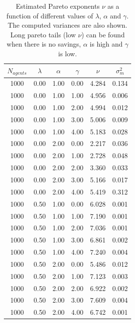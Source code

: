 \documentclass[11pt,a4paper,titlepage]{article}
\begin{document}
\begin{table}[]
\centering
\caption{Estimated Pareto exponents $\nu$ as a function of different values of  $\lambda$, $\alpha$ and $\gamma$. The computed variances are also shown. Long pareto tails (low $\nu$) can be found when there is no savings, $\alpha$ is high and $\gamma$ is low.} \label{tab:gamma}
\begin{tabular}{| c | c | c | c | c | c |} \hline
\textbf{$N_{agents}$} & $\lambda$ & $\alpha$ & $\gamma$ &  $\nu$ & $\sigma^2_m$\\ \hline
1000 & 0.00 & 1.00 & 0.00 & 4.284 & 0.134 \\ \hline
1000 & 0.00 & 1.00 & 1.00 & 4.956 & 0.006 \\ \hline
1000 & 0.00 & 1.00 & 2.00 & 4.994 & 0.012 \\ \hline
1000 & 0.00 & 1.00 & 3.00 & 5.006 & 0.009 \\ \hline
1000 & 0.00 & 1.00 & 4.00 & 5.183 & 0.028 \\ \hline

1000 & 0.00 & 2.00 & 0.00 & 2.217 & 0.036 \\ \hline
1000 & 0.00 & 2.00 & 1.00 & 2.728 & 0.048 \\ \hline
1000 & 0.00 & 2.00 & 2.00 & 3.360 & 0.033 \\ \hline
1000 & 0.00 & 2.00 & 3.00 & 5.166 & 0.017 \\ \hline
1000 & 0.00 & 2.00 & 4.00 & 5.419 & 0.312 \\ \hline

1000 & 0.50 & 1.00 & 0.00 & 6.028 & 0.001 \\ \hline
1000 & 0.50 & 1.00 & 1.00 & 7.190 & 0.001 \\ \hline
1000 & 0.50 & 1.00 & 2.00 & 7.036 & 0.001 \\ \hline
1000 & 0.50 & 1.00 & 3.00 & 6.861 & 0.002 \\ \hline
1000 & 0.50 & 1.00 & 4.00 & 7.240 & 0.004 \\ \hline

1000 & 0.50 & 2.00 & 0.00 & 5.486 & 0.012 \\ \hline
1000 & 0.50 & 2.00 & 1.00 & 7.123 & 0.003 \\ \hline
1000 & 0.50 & 2.00 & 2.00 & 6.922 & 0.002 \\ \hline
1000 & 0.50 & 2.00 & 3.00 & 7.609 & 0.004 \\ \hline
1000 & 0.50 & 2.00 & 4.00 & 6.742 & 0.001 \\ \hline

\end{tabular}
\end{table}
\end{document}
